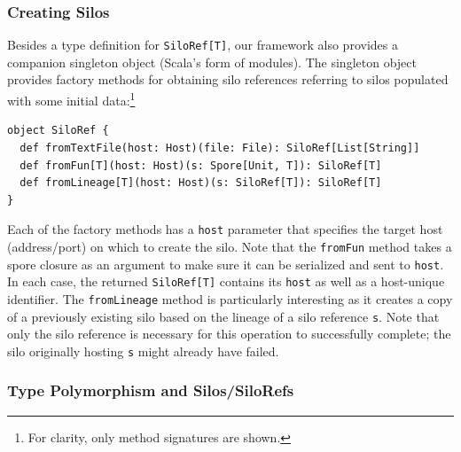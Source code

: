 \documentclass{jfp1}
\begin{document}

\subsubsection{Creating Silos}
\label{sec:creating-silos}

Besides a type definition for \verb|SiloRef[T]|, our framework also provides a
companion singleton object (Scala's form of modules). The singleton object
provides factory methods for obtaining silo references referring to silos populated
with some initial data:\footnote{For clarity, only method signatures are shown.}

\begin{lstlisting}
object SiloRef {
  def fromTextFile(host: Host)(file: File): SiloRef[List[String]]
  def fromFun[T](host: Host)(s: Spore[Unit, T]): SiloRef[T]
  def fromLineage[T](host: Host)(s: SiloRef[T]): SiloRef[T]
}
\end{lstlisting}
\noindent
Each of the factory methods has a \verb|host| parameter that specifies the
target host (address/port) on which to create the silo. Note that the
\verb|fromFun| method takes a spore closure as an argument to make sure it can
be serialized and sent to \verb|host|. In each case, the returned
\verb|SiloRef[T]| contains its \verb|host| as well as a
host-unique identifier. The \verb|fromLineage| method is
particularly interesting as it creates a copy of a previously existing silo
based on the lineage of a silo reference \verb|s|. Note that only the silo
reference is necessary for this operation to successfully complete; the silo
originally hosting \verb|s| might already have failed.

\subsubsection{Type Polymorphism and Silos/SiloRefs}
\end{document}
